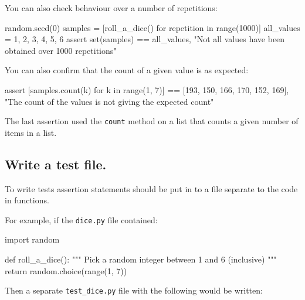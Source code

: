 You can also check behaviour over a number of repetitions:





\begin{pyin}
random.seed(0)
samples = [roll_a_dice() for repetition in range(1000)]
all_values = {1, 2, 3, 4, 5, 6}
assert set(samples) == all_values, "Not all values have been obtained over 1000 repetitions"
\end{pyin}






You can also confirm that the count of a given value is as expected:


\begin{pyin}
assert [samples.count(k) for k in range(1, 7)] == [193, 150, 166, 170, 152, 169], "The count of the values is not giving the expected count"
\end{pyin}


\begin{note}
The last assertion used the \texttt{count} method on a list that counts a given number
of items in a list.
\end{note}



\subsection{Write a test file.}

To write tests assertion statements should be put in to a file separate to the code
in functions.


For example, if the \texttt{dice.py} file contained:

\begin{python}
import random


def roll_a_dice():
    """
    Pick a random integer between 1 and 6 (inclusive)
    """
    return random.choice(range(1, 7))
\end{python}


Then a separate \texttt{test\_dice.py} file with the following would be written:

